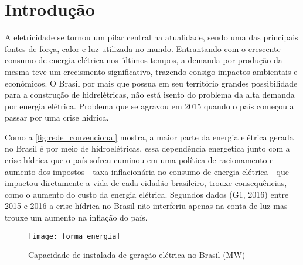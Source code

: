 \chapter[Introdução]{Introdução}
\label{ch:introdução}
A eletricidade se tornou um pilar central na atualidade, sendo uma das principais fontes de força, calor e luz utilizada no  mundo. Entrantando com o
crescente consumo de energia elétrica nos últimos tempos, a demanda por produção da mesma teve um crecismento significativo, trazendo consigo 
impactos ambientais e econômicos. O Brasil por mais que possua em seu território grandes possibilidade para a construção de hidrelétricas, não
está isento do problema da alta demanda por energia elétrica. Problema que se agravou em 2015 quando o país começou a passar por
uma crise hídrica.

Como a \autoref{fig:rede_convencional} mostra, a maior parte da energia elétrica gerada no Brasil é por meio de hidroelétricas, essa dependência
energetica junto com a crise hídrica que o país sofreu cuminou em uma política de racionamento e aumento dos impostos - taxa inflacionária no
consumo de energia elétrica - que impactou diretamente a vida de cada cidadão brasileiro, trouxe consequências, como o aumento do 
custo da energia elétrica. Segundos dados (G1, 2016) entre 2015 e 2016 a crise hídrica no Brasil não interferiu apenas na conta de luz mas trouxe
um aumento na inflação do país.




\begin{figure}[h!]
	\texttt{[image: forma\_energia]}
	\centering
	\caption[Capacidade de instalada de geração elétrica no Brasil (MW)]{Capacidade de instalada de geração elétrica no Brasil (MW)}
	\label{fig:rede_convencional}
\end{figure}
\FloatBarrier

